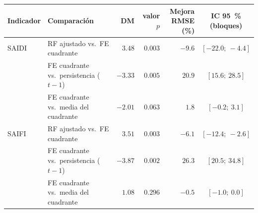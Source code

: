 \begin{tabular}{l l r r r c}
\toprule
\textbf{Indicador} & \textbf{Comparación} & \textbf{DM} & \textbf{valor $p$} & \makecell[c]{\textbf{Mejora}\\\textbf{RMSE (\%)}} & \makecell[c]{\textbf{IC 95~\%}\\\textbf{(bloques)}} \\
\midrule
SAIDI & RF ajustado vs.\ FE cuadrante & $3{.}48$ & $0{.}003$ & $-9{.}6$ & $[-22{.}0;\ -4{.}4]$ \\
 & FE cuadrante vs.\ persistencia ($t-1$) & $-3{.}33$ & $0{.}005$ & $20{.}9$ & $[15{.}6;\ 28{.}5]$ \\
 & FE cuadrante vs.\ media del cuadrante & $-2{.}01$ & $0{.}063$ & $1{.}8$ & $[-0{.}2;\ 3{.}1]$ \\
\addlinespace
SAIFI & RF ajustado vs.\ FE cuadrante & $3{.}51$ & $0{.}003$ & $-6{.}1$ & $[-12{.}4;\ -2{.}6]$ \\
 & FE cuadrante vs.\ persistencia ($t-1$) & $-3{.}87$ & $0{.}002$ & $26{.}3$ & $[20{.}5;\ 34{.}8]$ \\
 & FE cuadrante vs.\ media del cuadrante & $1{.}08$ & $0{.}296$ & $-0{.}5$ & $[-1{.}0;\ 0{.}0]$ \\
\bottomrule
\end{tabular}
